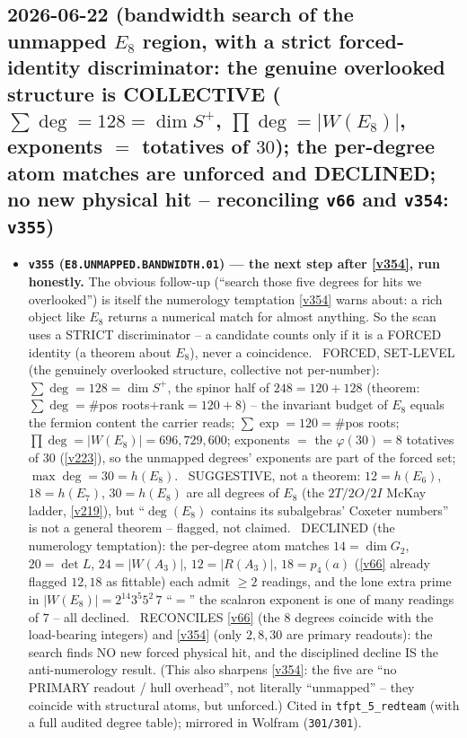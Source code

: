 \subsection*{2026-06-22 (bandwidth search of the unmapped $E_8$ region, with a strict forced-identity discriminator: the genuine overlooked structure is COLLECTIVE ($\sum\deg=128=\dim S^+$, $\prod\deg=|W(E_8)|$, exponents $=$ totatives of $30$); the per-degree atom matches are unforced and DECLINED; no new physical hit -- reconciling \texttt{v66} and \texttt{v354}: \texttt{v355})}
\begin{itemize}
\item \textbf{\texttt{v355} (\texttt{E8.UNMAPPED.BANDWIDTH.01}) --- the next step after \vref{v354}, run honestly.} The
obvious follow-up (``search those five degrees for hits we overlooked'') is itself the numerology temptation
\vref{v354} warns about: a rich object like $E_8$ returns a numerical match for almost anything. So the scan uses a
STRICT discriminator -- a candidate counts only if it is a FORCED identity (a theorem about $E_8$), never a
coincidence. \mE\ FORCED, SET-LEVEL (the genuinely overlooked structure, collective not per-number): $\sum\deg=128=
\dim S^+$, the spinor half of $248=120+128$ (theorem: $\sum\deg=\#$pos roots$+$rank$=120+8$) -- the invariant budget
of $E_8$ equals the fermion content the carrier reads; $\sum\exp=120=\#$pos roots; $\prod\deg=|W(E_8)|=696{,}729{,}600$;
exponents $=$ the $\varphi(30){=}8$ totatives of $30$ (\vref{v223}), so the unmapped degrees' exponents are part of the
forced set; $\max\deg=30=h(E_8)$. \mC\ SUGGESTIVE, not a theorem: $12{=}h(E_6)$, $18{=}h(E_7)$, $30{=}h(E_8)$ are all
degrees of $E_8$ (the $2T/2O/2I$ McKay ladder, \vref{v219}), but ``$\deg(E_8)$ contains its subalgebras' Coxeter
numbers'' is not a general theorem -- flagged, not claimed. \mO\ DECLINED (the numerology temptation): the per-degree
atom matches $14{=}\dim G_2$, $20{=}\det L$, $24{=}|W(A_3)|$, $12{=}|R(A_3)|$, $18{=}p_4(a)$ (\vref{v66} already flagged
$12,18$ as fittable) each admit $\ge2$ readings, and the lone extra prime in $|W(E_8)|=2^{14}3^5 5^2\,7$ ``$=$'' the
scalaron exponent is one of many readings of $7$ -- all declined. \mE\ RECONCILES \vref{v66} (the 8 degrees coincide
with the load-bearing integers) and \vref{v354} (only $2,8,30$ are primary readouts): the search finds NO new forced
physical hit, and the disciplined decline IS the anti-numerology result. (This also sharpens \vref{v354}: the five are
``no PRIMARY readout / hull overhead'', not literally ``unmapped'' -- they coincide with structural atoms, but
unforced.) Cited in \texttt{tfpt\_5\_redteam} (with a full audited degree table); mirrored in Wolfram (\texttt{301/301}).
\end{itemize}

